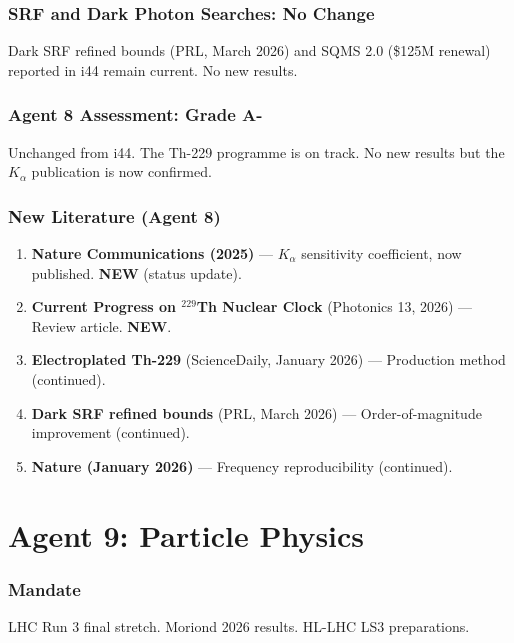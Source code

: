 \documentclass[11pt,a4paper]{article}
\newcommand{\NEW}{\textcolor{dfdblue}{\textbf{NEW}}}
\begin{document}
\section{SRF and Dark Photon Searches: No Change}

Dark SRF refined bounds (PRL, March 2026) and SQMS 2.0 (\$125M renewal) reported in i44 remain current. No new results.

\section{Agent 8 Assessment: Grade A-}

Unchanged from i44. The Th-229 programme is on track. No new results but the $K_\alpha$ publication is now confirmed.

\section{New Literature (Agent 8)}

\begin{enumerate}
\item \textbf{Nature Communications (2025)} --- $K_\alpha$ sensitivity coefficient, now published. \NEW{} (status update).
\item \textbf{Current Progress on $^{229}$Th Nuclear Clock} (Photonics 13, 2026) --- Review article. \NEW.
\item \textbf{Electroplated Th-229} (ScienceDaily, January 2026) --- Production method (continued).
\item \textbf{Dark SRF refined bounds} (PRL, March 2026) --- Order-of-magnitude improvement (continued).
\item \textbf{Nature (January 2026)} --- Frequency reproducibility (continued).
\end{enumerate}


\part{Agent 9: Particle Physics}
\label{part:agent9}

\section{Mandate}

LHC Run 3 final stretch. Moriond 2026 results. HL-LHC LS3 preparations.
\end{document}
